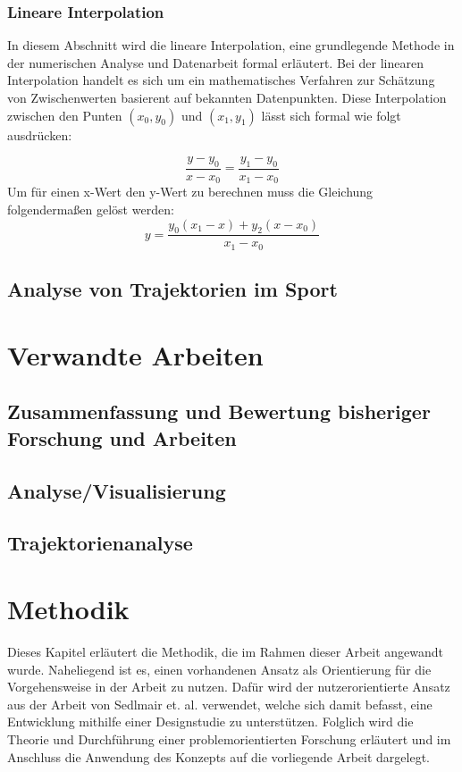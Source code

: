 \documentclass[
  ngerman,
  a4paper,  %
  twoside,  %
  bibliography=totoc,
  headsepline,
  cleardoublepage=empty,
  parskip=half,
  draft=false
]{scrbook}
\begin{document}
\subsection{Lineare Interpolation}
In diesem Abschnitt wird die lineare Interpolation, eine grundlegende Methode in der numerischen Analyse und Datenarbeit formal erläutert. Bei der linearen Interpolation handelt es sich um ein mathematisches Verfahren zur Schätzung von Zwischenwerten basierent auf bekannten Datenpunkten. Diese Interpolation zwischen den Punten $(x_0,y_0)$ und $(x_1,y_1)$ lässt sich formal wie folgt ausdrücken:

\begin{equation}
  \frac{y-y_0}{x-x_0}=\frac{y_1-y_0}{x_1-x_0}
\end{equation}
Um für einen x-Wert den y-Wert zu berechnen muss die Gleichung folgendermaßen gelöst werden:
\begin{equation}
  y=\frac{y_0(x_1-x)+y_2(x-x_0)}{x_1-x_0}
\end{equation}


\section{Analyse von Trajektorien im Sport}


\chapter{Verwandte Arbeiten}
\section{Zusammenfassung und Bewertung bisheriger Forschung und Arbeiten}
\section{Analyse/Visualisierung}
\section{Trajektorienanalyse}

\chapter{Methodik}
Dieses Kapitel erläutert die Methodik, die im Rahmen dieser Arbeit angewandt wurde. Naheliegend ist es, einen vorhandenen Ansatz als Orientierung für die Vorgehensweise in der Arbeit zu nutzen. Dafür wird der nutzerorientierte Ansatz aus der Arbeit von Sedlmair et. al. \cite{sedlmair_design_2012} verwendet, welche sich damit befasst, eine Entwicklung mithilfe einer Designstudie zu unterstützen. Folglich wird die Theorie und Durchführung einer problemorientierten Forschung erläutert und im Anschluss die Anwendung des Konzepts auf die vorliegende Arbeit dargelegt.
\end{document}
